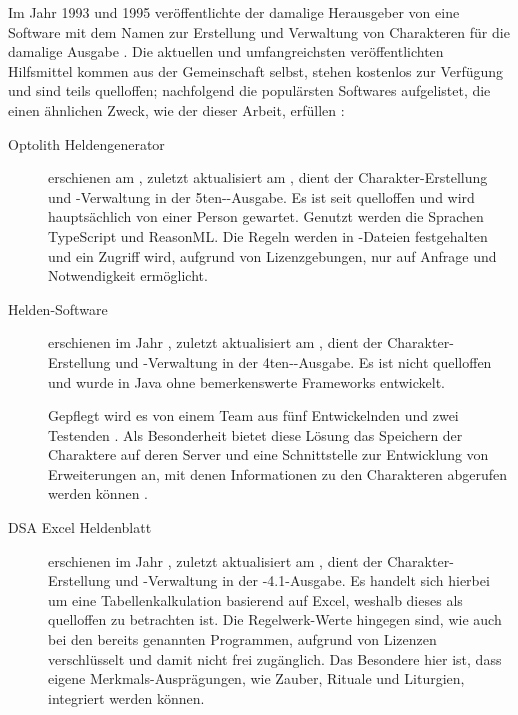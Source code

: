 Im Jahr 1993 und 1995 veröffentlichte der damalige Herausgeber von  eine Software mit dem Namen  zur Erstellung und Verwaltung von Charakteren für die damalige Ausgabe .
Die aktuellen und umfangreichsten veröffentlichten Hilfsmittel kommen aus der Gemeinschaft selbst, stehen kostenlos zur Verfügung und sind teils quelloffen;
nachfolgend die populärsten Softwares aufgelistet, die einen ähnlichen Zweck, wie der dieser Arbeit, erfüllen :
\begin{description}
    \item[Optolith Heldengenerator] erschienen am , zuletzt aktualisiert am , dient der Charakter-Erstellung und -Verwaltung in der 5ten--Ausgabe.
    Es ist seit  quelloffen und wird hauptsächlich von einer Person gewartet.
    Genutzt werden die Sprachen TypeScript und ReasonML.
    Die Regeln werden in -Dateien festgehalten und ein Zugriff wird, aufgrund von Lizenzgebungen, nur auf Anfrage und Notwendigkeit ermöglicht.

    \item[Helden-Software] erschienen im Jahr , zuletzt aktualisiert am , dient der Charakter-Erstellung und -Verwaltung in der 4ten--Ausgabe.
    Es ist nicht quelloffen und wurde in Java ohne bemerkenswerte Frameworks entwickelt. 

    Gepflegt wird es von einem Team aus fünf Entwickelnden und zwei Testenden .
    Als Besonderheit bietet diese Lösung das Speichern der Charaktere auf deren Server und eine Schnittstelle zur Entwicklung von Erweiterungen an, mit denen Informationen zu den Charakteren abgerufen werden können .

    \item[DSA Excel Heldenblatt] erschienen im Jahr , zuletzt aktualisiert am , dient der Charakter-Erstellung und -Verwaltung in der -4.1-Ausgabe.
    Es handelt sich hierbei um eine Tabellenkalkulation basierend auf Excel, weshalb dieses als quelloffen zu betrachten ist.
    Die Regelwerk-Werte hingegen sind, wie auch bei den bereits genannten Programmen, aufgrund von Lizenzen verschlüsselt und damit nicht frei zugänglich.
    Das Besondere hier ist, dass eigene Merkmals-Ausprägungen, wie \zB Zauber, Rituale und Liturgien, integriert werden können.


\end{description}
